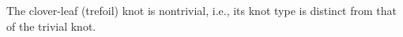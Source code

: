 The clover-leaf (trefoil) knot is nontrivial, i.e., its knot type is distinct from that of the trivial knot.
